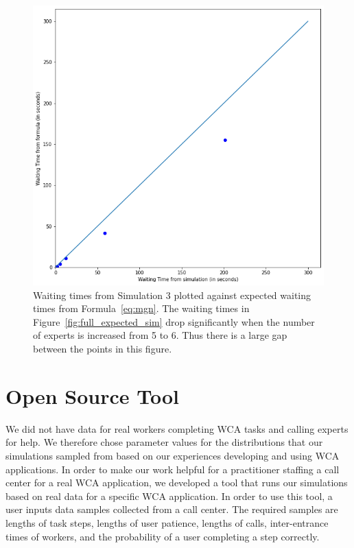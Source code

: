 \begin{figure}[H]
  \includegraphics[width=\textwidth]{figures/montecarlo/gof.png}
  \caption{
    Waiting times from Simulation 3 plotted against expected
    waiting times from Formula~\ref{eq:mgn}.
    The waiting times in Figure~\ref{fig:full_expected_sim} drop significantly
    when the number of experts is increased from 5 to 6.
    Thus there is a large gap between the points in this figure.
  }\label{fig:gof}
\end{figure}

\section{Open Source Tool}

We did not have data for real workers completing WCA tasks and calling experts
for help.
We therefore chose parameter values for the distributions that our simulations
sampled from based on our experiences developing and using WCA applications.
In order to make our work helpful for a practitioner staffing a call center for
a real WCA application, we developed a tool that runs our simulations based on
real data for a specific WCA application.
In order to use this tool, a user inputs data samples collected from a call
center.
The required samples are lengths of task steps, lengths of user patience,
lengths of calls, inter-entrance times of workers, and the probability of a user
completing a step correctly.

